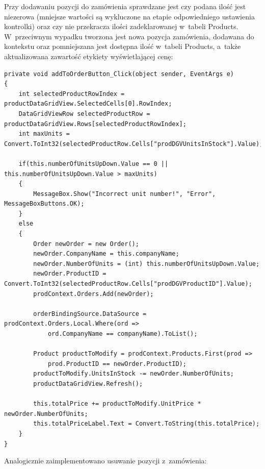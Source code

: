 \documentclass[12pt, a4paper]{mwart}
\begin{document}
Przy dodawaniu pozycji do zamówienia sprawdzane jest czy podana ilość jest niezerowa (mniejsze wartości są wykluczone na etapie odpowiedniego ustawienia kontrolki) oraz czy nie przekracza ilości zadeklarowanej w~tabeli Products. W~przeciwnym wypadku tworzona jest nowa pozycja zamówienia, dodawana do kontekstu oraz pomniejszana jest dostępna ilość w~tabeli Products, a~także aktualizowana zawartość etykiety wyświetlającej cenę:

\begin{lstlisting}
private void addToOrderButton_Click(object sender, EventArgs e)
{
    int selectedProductRowIndex = productDataGridView.SelectedCells[0].RowIndex;
    DataGridViewRow selectedProductRow = productDataGridView.Rows[selectedProductRowIndex];
    int maxUnits = Convert.ToInt32(selectedProductRow.Cells["prodDGVUnitsInStock"].Value);

    if(this.numberOfUnitsUpDown.Value == 0 || this.numberOfUnitsUpDown.Value > maxUnits)
    {
    	MessageBox.Show("Incorrect unit number!", "Error", MessageBoxButtons.OK);
    }
    else
    {
		Order newOrder = new Order();
		newOrder.CompanyName = this.companyName;
		newOrder.NumberOfUnits = (int) this.numberOfUnitsUpDown.Value;
		newOrder.ProductID = Convert.ToInt32(selectedProductRow.Cells["prodDGVProductID"].Value);
		prodContext.Orders.Add(newOrder);

		orderBindingSource.DataSource = prodContext.Orders.Local.Where(ord => 
			ord.CompanyName == companyName).ToList();               

		Product productToModify = prodContext.Products.First(prod => 
			prod.ProductID == newOrder.ProductID);
		productToModify.UnitsInStock -= newOrder.NumberOfUnits;
		productDataGridView.Refresh();

		this.totalPrice += productToModify.UnitPrice * newOrder.NumberOfUnits;
		this.totalPriceLabel.Text = Convert.ToString(this.totalPrice);
	}
}
\end{lstlisting}

Analogicznie zaimplementowano usuwanie pozycji z~zamówienia:
\end{document}
